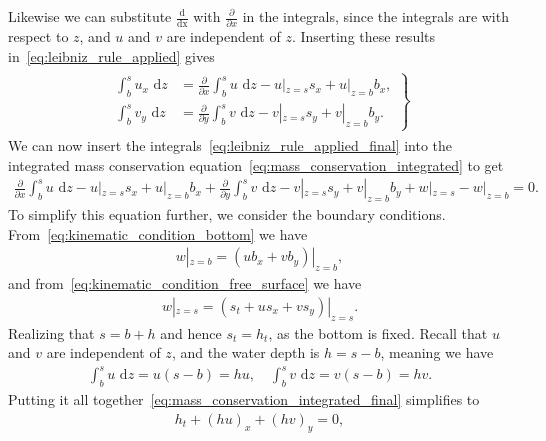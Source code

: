 Likewise we can substitute $\frac{\text{d}}{\text{dx}}$ with $\frac{\partial}{\partial x}$ in the integrals, since the integrals are with respect to $z$, and $u$ and $v$ are independent of $z$.
Inserting these results in~\eqref{eq:leibniz_rule_applied} gives
\begin{align}\label{eq:leibniz_rule_applied_final}
    \begin{gathered}
        \left.
            \begin{aligned}
                \int_{b}^{s} u_x \text{ d} z &=  \frac{\partial}{\partial x}  \int_{b}^{s} u \text{ d} z  - u|_{z = s} s_x + u|_{z = b} b_x, \\
                \int_{b}^{s} v_y \text{ d} z &= \frac{\partial}{\partial y}  \int_{b}^{s} v \text{ d} z  - v|_{z = s} s_y + v|_{z = b} b_y.
            \end{aligned}
        \right\}
    \end{gathered}
\end{align}
We can now insert the integrals~\eqref{eq:leibniz_rule_applied_final} into the integrated mass conservation equation~\eqref{eq:mass_conservation_integrated} to get
\begin{align}\label{eq:mass_conservation_integrated_final}
    \frac{\partial}{\partial x}  \int_{b}^{s} u \text{ d} z  - u|_{z = s} s_x + u|_{z = b} b_x
    + \frac{\partial}{\partial y}  \int_{b}^{s} v \text{ d} z  - v|_{z = s} s_y + v|_{z = b} b_y
    + w|_{z = s} - w|_{z = b} = 0.
\end{align}
To simplify this equation further, we consider the boundary conditions.
From~\eqref{eq:kinematic_condition_bottom} we have
\begin{align}
    w|_{z = b} = (u b_x + v b_y)|_{z = b},
\end{align}
and from~\eqref{eq:kinematic_condition_free_surface} we have
\begin{align}
    w|_{z = s} = (s_t + u s_x + v s_y)|_{z = s}.
\end{align}
Realizing that $s = b + h$ and hence $s_t = h_t$, as the bottom is fixed.
Recall that $u$ and $v$ are independent of $z$, and the water depth is $h = s - b$, meaning we have
\begin{align*}
    \int_{b}^{s} u \text{ d} z = u(s - b) = hu, \quad \int_{b}^{s} v \text{ d} z = v(s - b) = hv.
\end{align*}
Putting it all together~\eqref{eq:mass_conservation_integrated_final} simplifies to
\begin{align}\label{eq:SWE_1}
    h_t + {(hu)}_x + {(hv)}_y = 0,
\end{align}
